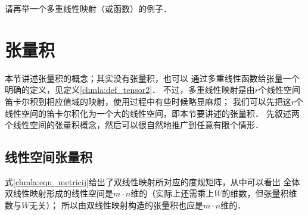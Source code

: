 \begin{exercise}
	请再举一个多重线性映射（或函数）的例子．
\end{exercise}


\section{张量积}\label{chmla:sec_tensor-product}
本节讲述张量积的概念；其实没有张量积，也可以
通过多重线性函数给张量一个明确的定义，见定义\ref{chmla:def_tensor2}．
不过，多重线性映射是由$r$个线性空间笛卡尔积到相应值域的映射，使用过程中有些时候略显麻烦；
我们可以先把这$r$个线性空间的笛卡尔积化为一个大的线性空间，即本节要讲述的{\kaishu 张量积}．
先叙述两个线性空间的张量积概念，然后可以很自然地推广到任意有限个情形．

\subsection{线性空间张量积}
式\eqref{chmla:eqn_metricij}给出了双线性映射所对应的度规矩阵，从中可以看出
全体双线性映射形成的线性空间是$m\cdot n$维的（实际上还需乘上$W$的维数，但张量积维数与$W$无关）；
所以由双线性映射构造的张量积也应是$m\cdot n$维的．

